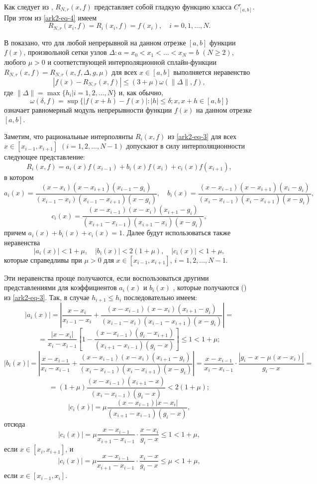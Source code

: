Как следует из \cite{ark-9}, $R_{N,r}(x,f)$ представляет собой гладкую функцию
 класса $C^r_{[a,b]}$. При этом из \eqref{ark2-eq-4} имеем
\begin{equation}\label{ark2-eq-5}
R_{N,r}(x_i,f)=R_i(x_i,f)=f(x_i),\quad i=0,1,\dots,N.
\end{equation}

В \cite{ark-10} показано, что для любой непрерывной на данном отрезке $[a,b]$ функции $f(x)$,
произвольной сетки узлов $\Delta: a=x_0<x_1<\dots<x_N=b$ $(N\geqslant 2)$, любого
$\mu>0$ и соответствующей интерполяционной сплайн-функции
$R_{N,r}(x,f)=R_{N,r}(x,f,\Delta,g,\mu)$ для всех $x\in[a,b]$ выполняется неравенство
\begin{equation}\label{ark2-eq-6}
|f(x)-R_{N,r}(x,f)|\leqslant (3+\mu)\omega(\|\Delta\|,f),
\end{equation}
где $\|\Delta\|=\max\{h_i|i=1,2,\dots,N\}$ и, как обычно,
$$
\omega(\delta, f)=\sup\{|f(x+h)-f(x)|: |h|\leqslant \delta; x,x+h\in [a,b]\}
$$
означает равномерный модуль непрерывности функции $f(x)$ на данном отрезке $[a,b]$.

Заметим, что рациональные интерполянты $R_i(x,f)$ из \eqref{ark2-eq-3} для всех $x\in[x_{i-1},x_{i+1}]$
$(i=1,2,\dots,N-1)$ допускают в силу интерполяционности следующее представление:
\begin{equation}\label{ark2-eq-7}
R_i(x,f)=a_i(x)f(x_{i-1})+b_i(x)f(x_i)+c_i(x)f(x_{i+1}),
\end{equation}
в котором
$$
a_i(x)=\frac{(x-x_i)(x-x_{i+1})(x_{i-1}-g_i)}
{(x_{i-1}-x_i)(x_{i-1}-x_{i+1})(x-g_i)},
\quad
b_i(x)=\frac{(x-x_{i-1})(x-x_{i+1})(x_i-g_i)}
{(x_i-x_{i-1})(x_i-x_{i+1})(x-g_i)},
$$
$$
c_i(x)=\frac{(x-x_{i-1})(x-x_i)(x_{i+1}-g_i)}
{(x_{i+1}-x_{i-1})(x_{i+1}-x_i)(x-g_i)},
$$
причем $a_i(x)+b_i(x)+c_i(x)=1$.
Далее будут использоваться также неравенства
\begin{equation}\label{ark2-eq-8}
|a_i(x)|<1+\mu, \quad |b_i(x)|<2(1+\mu),\quad |c_i(x)|<1+\mu,
\end{equation}
которые справедливы при $\mu>0$ для $x\in[x_{i-1},x_{i+1}]$, $i=1,2,\dots,N-1$.

Эти неравенства проще получаются, если воспользоваться другими представлениями
для коэффициентов $a_i(x)$ и $b_i(x)$  , которые получаются (\cite{ark-10}) из \eqref{ark2-eq-3}.
Так, в случае $h_{i+1}\leqslant h_i$ последовательно имеем:
$$
|a_i(x)|=\left\vert \frac{x-x_i}{x_{i-1}-x_i}+\frac{(x-x_{i-1})(x-x_i)(x_{i+1}-g_i)}
{(x_{i-1}-x_i)(x_{i-1}-x_{i+1})(x-g_i)}\right\vert=
$$
$$
=\frac{|x-x_i|}{x_i-x_{i-1}}
\left[1-\frac{(x-x_{i-1})(g_i-x_{i+1})}{(x_{i+1}-x_{i-1})(g_i-x)}\right]\leqslant 1<1+\mu;
$$
$$
|b_i(x)|=\left\vert \frac{x-x_{i-1}}{x_i-x_{i-1}}+\frac{(x-x_{i-1})(x-x_i)(x_{i+1}-g_i)}
{(x_i-x_{i-1})(x_i-x_{i+1})(x-g_i)}\right\vert=
\frac{x-x_{i-1}}{x_i-x_{i-1}}\cdot\frac{|g_i-x-\mu(x-x_i)|}{g_i-x}=
$$
$$
=(1+\mu)\frac{(x-x_{i-1})(x_{i+1}-x)}{(x_i-x_{i-1})(g_i-x)}<2(1+\mu);
$$
$$
|c_i(x)|=\mu
\frac{(x-x_{i-1})|x-x_i|}{(x_{i+1}-x_{i-1})(g_i-x)},
$$
отсюда
$$
|c_i(x)|=\mu\frac{x-x_{i-1}}{x_{i+1}-x_{i-1}}\cdot \frac{x-x_i}{g_i-x}\leqslant 1<1+\mu,
$$
если $x\in[x_i, x_{i+1}]$, и
$$
|c_i(x)|=\mu\frac{x-x_{i-1}}{x_{i+1}-x_{i-1}}\cdot \frac{x_i-x}{g_i-x}\leqslant \mu<1+\mu,
$$
если $x\in[x_{i-1}, x_i]$.

